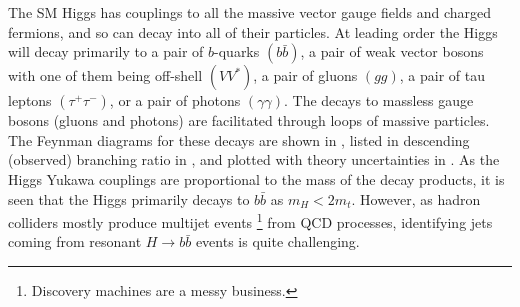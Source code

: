 The SM Higgs has couplings to all the massive vector gauge fields and charged fermions, and so can decay into all of their particles.
At leading order the Higgs will decay primarily to a pair of $b$-quarks $(b\bar{b})$, a pair of weak vector bosons with one of them being off-shell $(VV^{*})$, a pair of gluons $(gg)$, a pair of tau leptons $(\tau^{+}\tau^{-})$, or a pair of photons $(\gamma\gamma)$.
The decays to massless gauge bosons (gluons and photons) are facilitated through loops of massive particles.
The Feynman diagrams for these decays are shown in , listed in descending (observed) branching ratio in , and plotted with theory uncertainties in .
As the Higgs Yukawa couplings are proportional to the mass of the decay products, it is seen that the Higgs primarily decays to $b\bar{b}$ as $m_{H} < 2 m_{t}$.
However, as hadron colliders mostly produce multijet events%
\footnote{Discovery machines are a messy business.}
from QCD processes, identifying jets coming from resonant $H \to b\bar{b}$ events is quite challenging.

